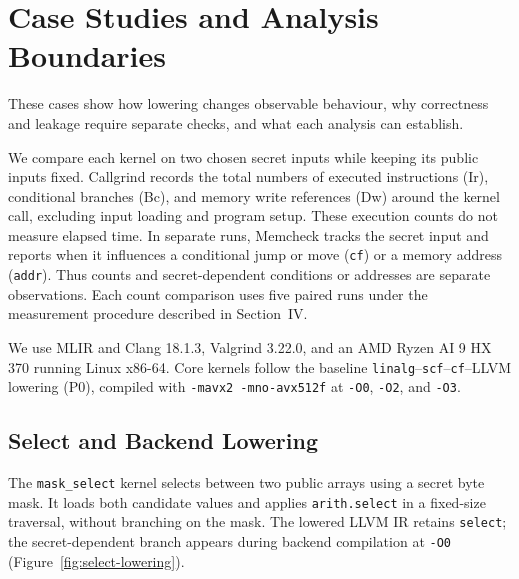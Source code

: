 \section{Case Studies and Analysis Boundaries}
\label{sec:evaluation}

These cases show how lowering changes observable behaviour, why correctness and leakage require separate checks, and what each analysis can establish.

We compare each kernel on two chosen secret inputs while keeping its public inputs fixed.
Callgrind records the total numbers of executed instructions (Ir), conditional branches (Bc), and memory write references (Dw) around the kernel call, excluding input loading and program setup.
These execution counts do not measure elapsed time.
In separate runs, Memcheck tracks the secret input and reports when it influences a conditional jump or move (\texttt{cf}) or a memory address (\texttt{addr}).
Thus counts and secret-dependent conditions or addresses are separate observations.
Each count comparison uses five paired runs under the measurement procedure described in Section~IV.

We use MLIR and Clang 18.1.3, Valgrind 3.22.0, and an AMD Ryzen AI 9 HX 370 running Linux x86-64.
Core kernels follow the baseline \texttt{linalg}--\texttt{scf}--\texttt{cf}--LLVM lowering (P0), compiled with \texttt{-mavx2 -mno-avx512f} at \texttt{-O0}, \texttt{-O2}, and \texttt{-O3}.

\subsection{Select and Backend Lowering}
\label{sec:evaluation:select}

The \texttt{mask\_select} kernel selects between two public arrays using a secret byte mask.
It loads both candidate values and applies \texttt{arith.select} in a fixed-size traversal, without branching on the mask.
The lowered LLVM IR retains \texttt{select}; the secret-dependent branch appears during backend compilation at \texttt{-O0} (Figure~\ref{fig:select-lowering}).

